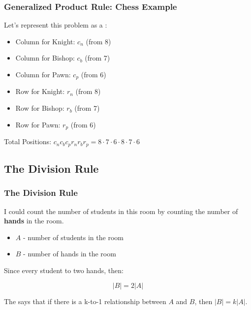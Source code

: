 \documentclass{beamer}
\begin{document}
\begin{frame}
  \frametitle{Generalized Product Rule: Chess Example}

  {\larger
  Let's represent this problem as a :
  \begin{itemize}
  \item Column for Knight: $c_n$ (from 8)
  \item Column for Bishop: $c_b$ (from 7)
  \item Column for Pawn: $c_p$ (from 6)
  \item Row for Knight: $r_n$ (from 8)
  \item Row for Bishop: $r_b$ (from 7)
  \item Row for Pawn: $r_p$ (from 6)
  \end{itemize}

  \bigskip

  Total Positions: $c_nc_bc_pr_nr_br_p = 8\cdot7\cdot6\cdot8\cdot7\cdot6$
  }
\end{frame}

\subsection{The Division Rule}

\begin{frame}
  \frametitle{The Division Rule}

  {\larger
    
  I could count the number of students in this room by \alert{counting
    the number of {\bf hands} in the room}.

  \bigskip

  \begin{itemize}
  \item $A$ - number of students in the room
  \item $B$ - number of hands in the room    
  \end{itemize}

  Since every student  to two hands, then:

  \begin{equation}
    |B| = 2|A|
  \end{equation}

  \vfill

  The  says that if there is a \alert{k-to-1}
  relationship between $A$ and $B$, then $|B| = k|A|$.

  }
\end{frame}
\end{document}
